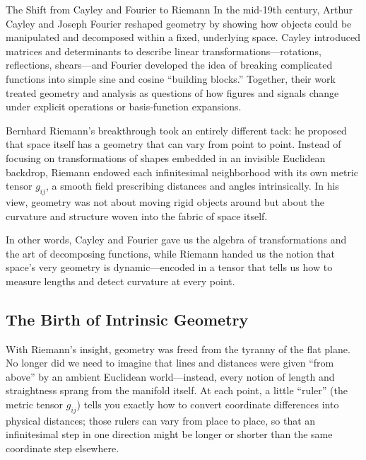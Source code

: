 \begin{HistoricalSidebar}{The Shift from Cayley and Fourier to Riemann}
In the mid-19th century, Arthur Cayley and Joseph Fourier reshaped geometry by showing how objects could be 
manipulated and decomposed within a fixed, underlying space.  Cayley introduced matrices and determinants to 
describe linear transformations—rotations, reflections, shears—and Fourier developed the idea of breaking 
complicated functions into simple sine and cosine “building blocks.”  Together, their work treated geometry 
and analysis as questions of how figures and signals change under explicit operations or basis‐function expansions.

\medskip

Bernhard Riemann’s breakthrough took an entirely different tack: he proposed that space itself has a 
geometry that can vary from point to point.  Instead of focusing on transformations of shapes embedded 
in an invisible Euclidean backdrop, Riemann endowed each infinitesimal neighborhood with its own metric 
tensor \(g_{ij}\), a smooth field prescribing distances and angles intrinsically.  In his view, geometry 
was not about moving rigid objects around but about the curvature and structure woven into the fabric of 
space itself.

\medskip

In other words, Cayley and Fourier gave us the algebra of transformations and the art of decomposing functions, 
while Riemann handed us the notion that space’s very geometry is dynamic—encoded in a tensor that tells us how 
to measure lengths and detect curvature at every point.  
\end{HistoricalSidebar}






\subsection{The Birth of Intrinsic Geometry}

With Riemann’s insight, geometry was freed from the tyranny of the flat plane.  No longer did we need to imagine that lines and distances were given “from above” by an ambient Euclidean world—instead, every notion of length and straightness sprang from the manifold itself.  At each point, a little “ruler” (the metric tensor \(g_{ij}\)) tells you exactly how to convert coordinate differences into physical distances; those rulers can vary from place to place, so that an infinitesimal step in one direction might be longer or shorter than the same coordinate step elsewhere.

